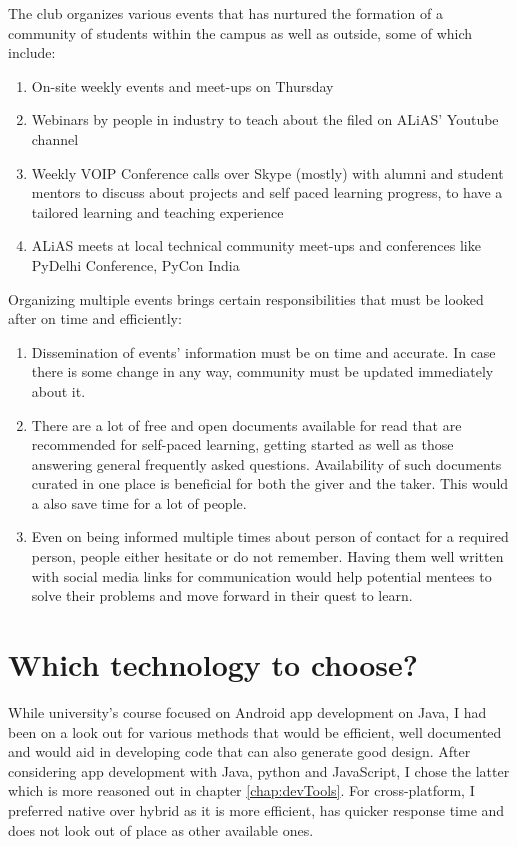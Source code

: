 The club organizes various events that has nurtured the formation of a community of students within the campus as well as outside, some of which include: 
\begin{enumerate}
    \item On-site weekly events and meet-ups on Thursday
    \item Webinars by people in industry to teach about the filed on ALiAS' Youtube channel
    \item Weekly VOIP Conference calls over Skype (mostly) with alumni and student mentors to discuss about projects and self paced learning progress, to have a tailored learning and teaching experience
    \item ALiAS meets at local technical community meet-ups and conferences like PyDelhi Conference, PyCon India
\end{enumerate}
\par \bigskip
Organizing multiple events brings certain responsibilities that must be looked after on time and efficiently:
\begin{enumerate}
    \item Dissemination of events' information must be on time and accurate. In case there is some change in any way, community must be updated immediately about it.
    \item There are a lot of free and open documents available for read that are recommended for self-paced learning, getting started as well as those answering general frequently asked questions. Availability of such documents curated in one place is beneficial for both the giver and the taker. This would a also save time for a lot of people. 
    \item Even on being informed multiple times about person of contact for a required person, people either hesitate or do not remember. Having them well written with social media links for communication would help potential mentees to solve their problems and move forward in their quest to learn.
\end{enumerate}

\section{Which technology to choose?}
While university's course focused on Android app development on Java, I had been on a look out for various methods that would be efficient, well documented and would aid in developing code that can also generate good design. After considering app development with Java, python and JavaScript, I chose the latter which is more reasoned out in chapter \ref{chap:devTools}. For cross-platform, I preferred native over hybrid as it is more efficient, has quicker response time and does not look out of place as other available ones.


